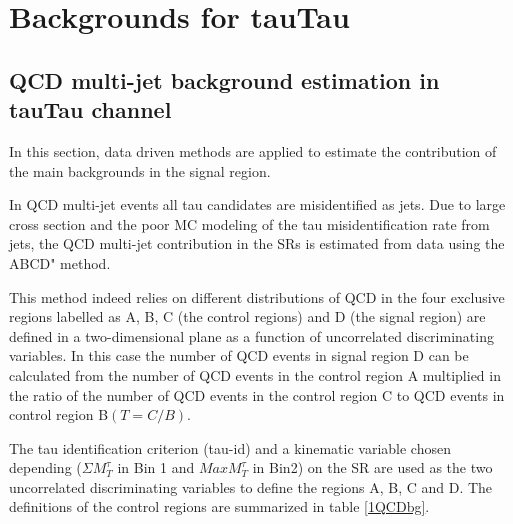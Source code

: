 \section{Backgrounds for tauTau}
\label{sect:bkg}


\subsection{QCD multi-jet background estimation in tauTau channel}

In this section, data driven methods are applied to estimate the contribution of
   the main backgrounds in the signal region.


In QCD multi-jet events all tau candidates are misidentified as jets. Due to large cross
section and
the poor MC modeling of the tau misidentification rate from jets, the QCD multi-jet contribution in the SRs is estimated from data using the ABCD" method.

This method indeed relies on different distributions of QCD
in the four exclusive regions labelled as A, B, C (the control regions) and D (the signal region) are defined in a two-dimensional plane as a function of uncorrelated discriminating variables.
In this case the number of QCD events in signal region D can be calculated from the number of QCD events in the control region A multiplied in the ratio of the number of QCD events in the control region C to QCD events in control region B$(T=C/B)$.

The tau identification criterion (tau-id) and a kinematic variable chosen depending ($\Sigma M_{T}^{\tau}$ in Bin 1 and $MaxM_{T}^{\tau}$ in Bin2) 
on the SR are used as the two uncorrelated discriminating variables to define the regions A, B, C and D. The definitions of the control regions are summarized in table \ref{1QCDbg}.

